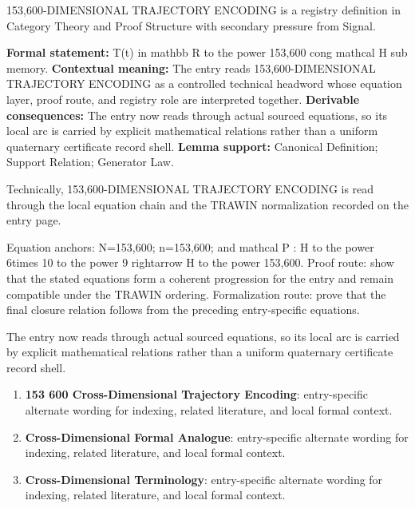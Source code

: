 
\begingroup\small
{}
153,600-DIMENSIONAL TRAJECTORY ENCODING is a registry definition in Category Theory and Proof Structure with secondary pressure from Signal.

\begingroup\footnotesize\setlength{\emergencystretch}{3em}\sloppy
\textbf{Formal statement:} T(t) in mathbb R to the power 153,600 cong mathcal H sub memory. \textbf{Contextual meaning:} The entry reads 153,600-DIMENSIONAL TRAJECTORY ENCODING as a controlled technical headword whose equation layer, proof route, and registry role are interpreted together. \textbf{Derivable consequences:} The entry now reads through actual sourced equations, so its local arc is carried by explicit mathematical relations rather than a uniform quaternary certificate record shell. \textbf{Lemma support:} Canonical Definition; Support Relation; Generator Law.\par
\endgroup

Technically, 153,600-DIMENSIONAL TRAJECTORY ENCODING is read through the local equation chain and the TRAWIN normalization recorded on the entry page.

Equation anchors: N=153,600; n=153,600; and mathcal P : H to the power 6times 10 to the power 9 rightarrow H to the power 153,600. Proof route: show that the stated equations form a coherent progression for the entry and remain compatible under the TRAWIN ordering. Formalization route: prove that the final closure relation follows from the preceding entry-specific equations.

The entry now reads through actual sourced equations, so its local arc is carried by explicit mathematical relations rather than a uniform quaternary certificate record shell.
\endgroup

\begin{enumerate}[leftmargin=1.6em,itemsep=6pt,topsep=4pt]
\item \textbf{153 600 Cross-Dimensional Trajectory Encoding}: entry-specific alternate wording for indexing, related literature, and local formal context.
\item \textbf{Cross-Dimensional Formal Analogue}: entry-specific alternate wording for indexing, related literature, and local formal context.
\item \textbf{Cross-Dimensional Terminology}: entry-specific alternate wording for indexing, related literature, and local formal context.
\end{enumerate}

